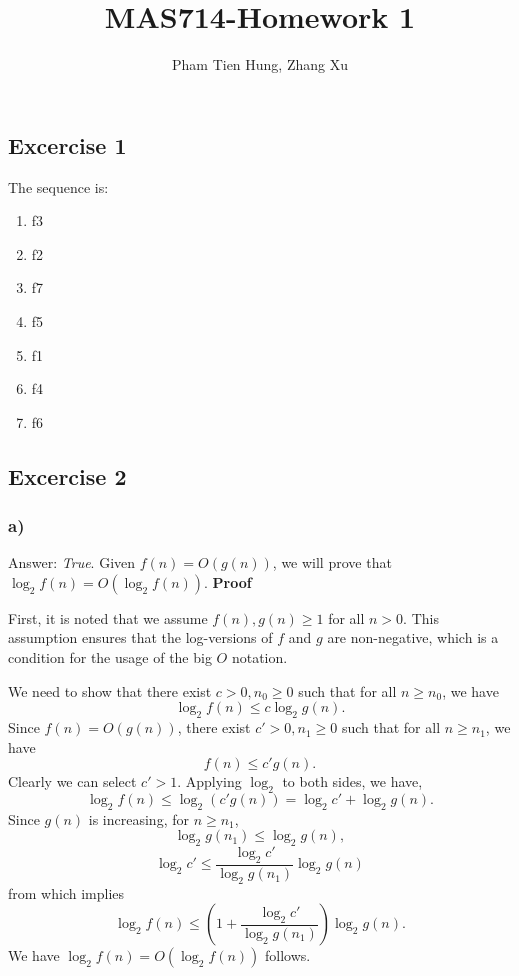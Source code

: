 \documentclass[a4paper,10pt,twoside]{article}
\title{MAS714-Homework 1}
\author{Pham Tien Hung, Zhang Xu
}
\date{}
\begin{document}
\maketitle

\subsection*{Excercise 1}

The sequence is:

\begin{enumerate}
	\item f3
	\item f2
	\item f7
	\item f5
	\item f1
	\item f4
	\item f6
\end{enumerate}

\subsection*{Excercise 2}
\subsubsection*{a)} 

Answer: \emph{True}. Given $f(n)=O(g(n))$, we will prove that $\log_2f(n) = O(\log_2f(n))$.
\textbf{Proof}

First, it is noted that we assume $f(n), g(n) \geq 1$ for all $n > 0$. This
assumption ensures that the log-versions of $f$ and $g$ are non-negative,
which is a condition for the usage of the big $O$ notation.

We need to show that there exist $c > 0, n_0 \geq 0$ such that for all $n \geq n_0$,
we have
\begin{equation}
	\label{eq:f=O(g)}
	\log_2f(n) \leq c \log_2g(n).
\end{equation}
Since $f(n)=O(g(n))$, there exist $c' > 0, n_1 \geq 0$ such that for all $n \geq n_1$,
we have
\[
	f(n) \leq c' g(n).
\]
Clearly we can select $c' > 1$. Applying $\log_2$ to both sides, we have,
\[
	\log_2f(n) \leq \log_2 (c' g(n)) = \log_2 c' + \log_2 g(n).
\]
Since $g(n)$ is increasing, for $n \geq n_1$,
\[
	\log_2 g(n_1) \leq \log_2 g(n),
\]
\[
	\log_2 c' \leq \frac{\log_2 c'}{\log_2 g(n_1)}\log_2 g(n)
\]
from which implies
\[
	\log_2f(n) \leq (1 + \frac{\log_2 c'}{\log_2 g(n_1)})\log_2 g(n).
\]
We have $\log_2f(n) = O(\log_2f(n))$ follows.
\end{document}
